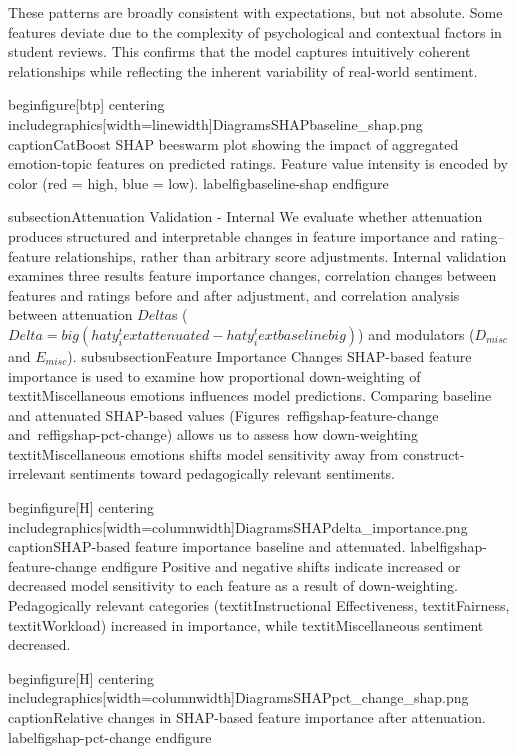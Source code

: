 These patterns are broadly consistent with expectations, but not absolute. Some features deviate due to the complexity of psychological and contextual factors in student reviews. This confirms that the model captures intuitively coherent relationships while reflecting the inherent variability of real-world sentiment.

begin{figure}[btp]  
    centering
    includegraphics[width=linewidth]{DiagramsSHAPbaseline_shap.png}
    caption{CatBoost SHAP beeswarm plot showing the impact of aggregated emotion-topic features on predicted ratings. Feature value intensity is encoded by color (red = high, blue = low).}
    label{figbaseline-shap}
end{figure}

subsection{Attenuation Validation - Internal}
We evaluate whether attenuation produces structured and interpretable changes in feature importance and rating–feature relationships, rather than arbitrary score adjustments. Internal validation examines three results feature importance changes, correlation changes between features and ratings before and after adjustment, and correlation analysis between attenuation $Delta$s ($Delta = big(hat{y}_i^text{attenuated} - hat{y}_i^text{baseline}big)$) and modulators ($D_{misc}$ and $E_{misc}$).
subsubsection{Feature Importance Changes}
SHAP-based feature importance is used to examine how proportional down-weighting of textit{Miscellaneous} emotions influences model predictions. Comparing baseline and attenuated SHAP-based values (Figures~ref{figshap-feature-change} and~ref{figshap-pct-change}) allows us to assess how down-weighting textit{Miscellaneous} emotions shifts model sensitivity away from construct-irrelevant sentiments toward pedagogically relevant sentiments.

begin{figure}[H]  
    centering
    includegraphics[width=columnwidth]{DiagramsSHAPdelta_importance.png}
    caption{SHAP-based feature importance baseline and attenuated.}
    label{figshap-feature-change}
end{figure}
Positive and negative shifts indicate increased or decreased model sensitivity to each feature as a result of down-weighting. Pedagogically relevant categories (textit{Instructional Effectiveness}, textit{Fairness}, textit{Workload}) increased in importance, while textit{Miscellaneous} sentiment decreased.

begin{figure}[H]  
    centering
    includegraphics[width=columnwidth]{DiagramsSHAPpct_change_shap.png}
    caption{Relative changes in SHAP-based feature importance after attenuation.}
    label{figshap-pct-change}
end{figure}

